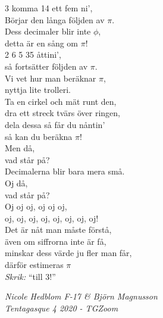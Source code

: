 \documentclass[a6paper,10pt]{article}
\begin{document}
\begin{center}
\end{center}
\small 3 komma 14 ett fem ni',\\
Börjar den långa följden av $\pi$.\\
Dess decimaler blir inte $\phi$,\\
detta är en sång om $\pi$!
\vspace{5pt}\\
2 6 5 35 åttini',\\
så fortsätter följden av $\pi$.\\
Vi vet hur man beräknar $\pi$,\\
nyttja lite trolleri.
\vspace{5pt}\\
Ta en cirkel och mät runt den,\\
dra ett streck tvärs över ringen,\\
dela dessa så får du nåntin’\\
så kan du beräkna $\pi$!
\vspace{5pt}\\
Men då,\\
vad står på?\\
Decimalerna blir bara mera små.\\
Oj då,\\
vad står på?\\
Oj oj oj, oj oj oj,\\
oj, oj, oj, oj, oj, oj, oj, oj!
\vspace{5pt}\\
Det är nåt man måste förstå,\\
även om siffrorna inte är få,\\
minskar dess värde ju fler man får,\\
därför estimeras $\pi$ 
\vspace{5pt}\\
\textit{Skrik:} “till 3!”

\begin{flushright}
\textit{Nicole Hedblom F-17 \& Björn Magnusson \\Tentagasque 4 2020 - TGZoom}
\end{flushright}

\setlength{\oddsidemargin}{-0.47in}
\end{document}
